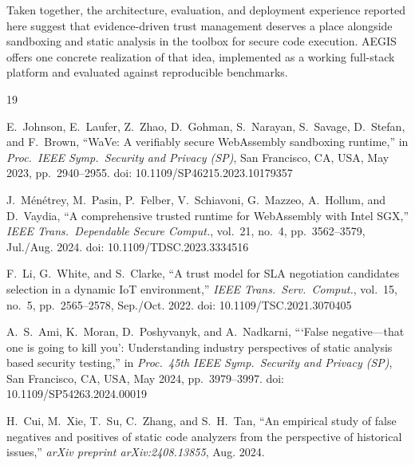 \documentclass[conference]{IEEEtran}
\begin{document}
Taken together, the architecture, evaluation, and deployment
experience reported here suggest that evidence-driven trust
management deserves a place alongside sandboxing and static
analysis in the toolbox for secure code execution. AEGIS offers
one concrete realization of that idea, implemented as a working
full-stack platform and evaluated against reproducible benchmarks.

\balance
\begin{thebibliography}{19}

E.~Johnson, E.~Laufer, Z.~Zhao, D.~Gohman, S.~Narayan,
S.~Savage, D.~Stefan, and F.~Brown,
``WaVe: A verifiably secure {WebAssembly} sandboxing runtime,''
in \emph{Proc.\ IEEE Symp.\ Security and Privacy (SP)},
San Francisco, CA, USA, May 2023, pp.~2940--2955.
doi: 10.1109/SP46215.2023.10179357

J.~M\'en\'etrey, M.~Pasin, P.~Felber, V.~Schiavoni, G.~Mazzeo,
A.~Hollum, and D.~Vaydia,
``A comprehensive trusted runtime for {WebAssembly} with {Intel SGX},''
\emph{IEEE Trans.\ Dependable Secure Comput.}, vol.~21, no.~4,
pp.~3562--3579, Jul./Aug. 2024.
doi: 10.1109/TDSC.2023.3334516

F.~Li, G.~White, and S.~Clarke,
``A trust model for {SLA} negotiation candidates selection in a
dynamic {IoT} environment,''
\emph{IEEE Trans.\ Serv.\ Comput.}, vol.~15, no.~5,
pp.~2565--2578, Sep./Oct. 2022.
doi: 10.1109/TSC.2021.3070405

A.~S.~Ami, K.~Moran, D.~Poshyvanyk, and A.~Nadkarni,
``{`False negative---that one is going to kill you'}:
Understanding industry perspectives of static analysis based
security testing,''
in \emph{Proc.\ 45th IEEE Symp.\ Security and Privacy (SP)},
San Francisco, CA, USA, May 2024, pp.~3979--3997.
doi: 10.1109/SP54263.2024.00019

H.~Cui, M.~Xie, T.~Su, C.~Zhang, and S.~H.~Tan,
``An empirical study of false negatives and positives of static
code analyzers from the perspective of historical issues,''
\emph{arXiv preprint arXiv:2408.13855}, Aug. 2024.


\end{thebibliography}
\end{document}
